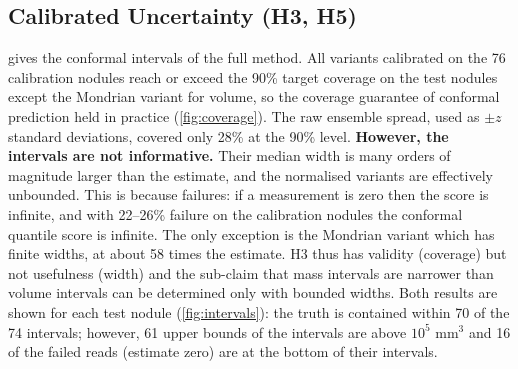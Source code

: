 
\subsection{Calibrated Uncertainty (H3, H5)}

 gives the conformal intervals of the full method. All variants calibrated on the 76 calibration nodules reach or exceed the 90\% target coverage on the test nodules except the Mondrian variant for volume, so the coverage guarantee of conformal prediction held in practice (\cref{fig:coverage}). The raw ensemble spread, used as $\pm z$ standard deviations, covered only 28\% at the 90\% level. \textbf{However, the intervals are not informative.} Their median width is many orders of magnitude larger than the estimate, and the normalised variants are effectively unbounded. This is because failures: if a measurement is zero then the score is infinite, and with 22--26\% failure on the calibration nodules the conformal quantile score is infinite. The only exception is the Mondrian variant which has finite widths, at about 58 times the estimate. H3 thus has validity (coverage) but not usefulness (width) and the sub-claim that mass intervals are narrower than volume intervals can be determined only with bounded widths. Both results are shown for each test nodule (\cref{fig:intervals}): the truth is contained within 70 of the 74 intervals; however, 61 upper bounds of the intervals are above $10^5$ mm$^3$ and 16 of the failed reads (estimate zero) are at the bottom of their intervals.

